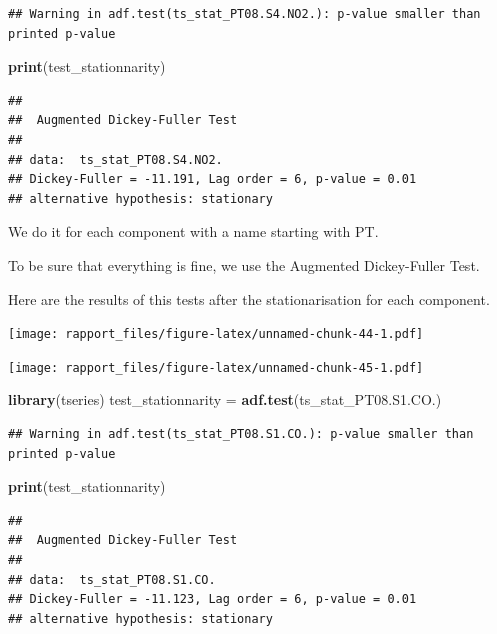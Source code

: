 \documentclass[]{article}
\newenvironment{Shaded}{\begin{snugshade}}{\end{snugshade}}
\newcommand{\KeywordTok}[1]{\textcolor[rgb]{0.13,0.29,0.53}{\textbf{#1}}}
\newcommand{\StringTok}[1]{\textcolor[rgb]{0.31,0.60,0.02}{#1}}
\newcommand{\NormalTok}[1]{#1}
\begin{document}
\begin{verbatim}
## Warning in adf.test(ts_stat_PT08.S4.NO2.): p-value smaller than printed p-value
\end{verbatim}

\begin{Shaded}
\begin{Highlighting}[]
\KeywordTok{print}\NormalTok{(test_stationnarity)}
\end{Highlighting}
\end{Shaded}

\begin{verbatim}
## 
##  Augmented Dickey-Fuller Test
## 
## data:  ts_stat_PT08.S4.NO2.
## Dickey-Fuller = -11.191, Lag order = 6, p-value = 0.01
## alternative hypothesis: stationary
\end{verbatim}

We do it for each component with a name starting with PT.

To be sure that everything is fine, we use the Augmented Dickey-Fuller
Test.

Here are the results of this tests after the stationarisation for each
component.

\texttt{[image: rapport\_files/figure-latex/unnamed-chunk-44-1.pdf]}

\texttt{[image: rapport\_files/figure-latex/unnamed-chunk-45-1.pdf]}

\begin{Shaded}
\begin{Highlighting}[]
\KeywordTok{library}\NormalTok{(tseries)}
\NormalTok{test_stationnarity =}\StringTok{ }\KeywordTok{adf.test}\NormalTok{(ts_stat_PT08.S1.CO.)}
\end{Highlighting}
\end{Shaded}

\begin{verbatim}
## Warning in adf.test(ts_stat_PT08.S1.CO.): p-value smaller than printed p-value
\end{verbatim}

\begin{Shaded}
\begin{Highlighting}[]
\KeywordTok{print}\NormalTok{(test_stationnarity)}
\end{Highlighting}
\end{Shaded}

\begin{verbatim}
## 
##  Augmented Dickey-Fuller Test
## 
## data:  ts_stat_PT08.S1.CO.
## Dickey-Fuller = -11.123, Lag order = 6, p-value = 0.01
## alternative hypothesis: stationary
\end{verbatim}
\end{document}
